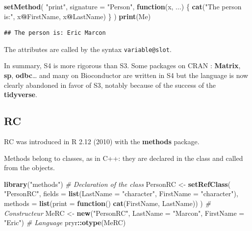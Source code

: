 \documentclass[
  12pt,
  american,
  a4paper,
  extrafontsizes,onecolumn,openright
  ]{memoir}
\newenvironment{Shaded}{\begin{snugshade}}{\end{snugshade}}
\newcommand{\AttributeTok}[1]{\textcolor[rgb]{0.13,0.29,0.53}{#1}}
\newcommand{\CommentTok}[1]{\textcolor[rgb]{0.56,0.35,0.01}{\textit{#1}}}
\newcommand{\ControlFlowTok}[1]{\textcolor[rgb]{0.13,0.29,0.53}{\textbf{#1}}}
\newcommand{\FunctionTok}[1]{\textcolor[rgb]{0.13,0.29,0.53}{\textbf{#1}}}
\newcommand{\NormalTok}[1]{#1}
\newcommand{\OtherTok}[1]{\textcolor[rgb]{0.56,0.35,0.01}{#1}}
\newcommand{\SpecialCharTok}[1]{\textcolor[rgb]{0.81,0.36,0.00}{\textbf{#1}}}
\newcommand{\StringTok}[1]{\textcolor[rgb]{0.31,0.60,0.02}{#1}}
\begin{document}
\scriptsize

\begin{Shaded}
\begin{Highlighting}[]
\FunctionTok{setMethod}\NormalTok{(}
  \StringTok{"print"}\NormalTok{,}
  \AttributeTok{signature =} \StringTok{"Person"}\NormalTok{,}
  \ControlFlowTok{function}\NormalTok{(x, ...) \{}
    \FunctionTok{cat}\NormalTok{(}\StringTok{"The person is:"}\NormalTok{, x}\SpecialCharTok{@}\NormalTok{FirstName, x}\SpecialCharTok{@}\NormalTok{LastName) }
\NormalTok{  \}}
\NormalTok{)}
\FunctionTok{print}\NormalTok{(Me)}
\end{Highlighting}
\end{Shaded}

\begin{verbatim}
## The person is: Eric Marcon
\end{verbatim}

\normalsize

The attributes are called by the syntax \texttt{variable@slot}.

In summary, S4 is more rigorous than S3.
Some packages on CRAN : \textbf{Matrix}, \textbf{sp}, \textbf{odbc}\ldots{} and many on Bioconductor are written in S4 but the language is now clearly abandoned in favor of S3, notably because of the success of the \textbf{tidyverse}.

\subsection{RC}\label{rc}

RC was introduced in R 2.12 (2010) with the \textbf{methods} package.

Methods belong to classes, as in C++: they are declared in the class and called from the objects.

\scriptsize

\begin{Shaded}
\begin{Highlighting}[]
\FunctionTok{library}\NormalTok{(}\StringTok{"methods"}\NormalTok{)}
\CommentTok{\# Declaration of the class}
\NormalTok{PersonRC }\OtherTok{\textless{}{-}} \FunctionTok{setRefClass}\NormalTok{(}
  \StringTok{"PersonRC"}\NormalTok{, }
  \AttributeTok{fields =} \FunctionTok{list}\NormalTok{(}\AttributeTok{LastName =} \StringTok{"character"}\NormalTok{, }\AttributeTok{FirstName =} \StringTok{"character"}\NormalTok{),}
  \AttributeTok{methods =} \FunctionTok{list}\NormalTok{(}\AttributeTok{print =} \ControlFlowTok{function}\NormalTok{() }\FunctionTok{cat}\NormalTok{(FirstName, LastName))}
\NormalTok{)}
\CommentTok{\# Constructeur}
\NormalTok{MeRC }\OtherTok{\textless{}{-}} \FunctionTok{new}\NormalTok{(}\StringTok{"PersonRC"}\NormalTok{, }\AttributeTok{LastName =} \StringTok{"Marcon"}\NormalTok{, }\AttributeTok{FirstName =} \StringTok{"Eric"}\NormalTok{)}
\CommentTok{\# Language}
\NormalTok{pryr}\SpecialCharTok{::}\FunctionTok{otype}\NormalTok{(MeRC)}
\end{Highlighting}
\end{Shaded}
\end{document}
